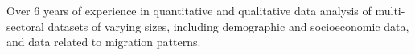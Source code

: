 
Over 6 years of experience in quantitative and qualitative data analysis of multi-sectoral datasets of varying sizes,
including demographic and socioeconomic data, and data related to migration patterns.